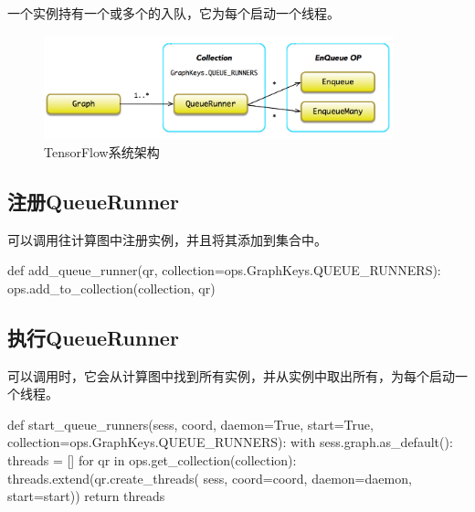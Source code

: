\begin{content}

一个实例持有一个或多个的入队，它为每个启动一个线程。

\begin{figure}[!htbp]
\centering
\includegraphics[width=0.9\textwidth]{figures/tf-queue-runner-model.png}
\caption{TensorFlow系统架构}
 \label{fig:tf-queue-runner-model}
\end{figure}

\subsection{注册QueueRunner}

可以调用往计算图中注册实例，并且将其添加到集合中。

\begin{leftbar}
\begin{python}
def add_queue_runner(qr, collection=ops.GraphKeys.QUEUE_RUNNERS):
  ops.add_to_collection(collection, qr)
\end{python}
\end{leftbar}

\subsection{执行QueueRunner}

可以调用时，它会从计算图中找到所有实例，并从实例中取出所有，为每个启动一个线程。

\begin{leftbar}
\begin{python}
def start_queue_runners(sess, coord, daemon=True, start=True,
                        collection=ops.GraphKeys.QUEUE_RUNNERS):
  with sess.graph.as_default():
    threads = []
    for qr in ops.get_collection(collection):
      threads.extend(qr.create_threads(
          sess, coord=coord, daemon=daemon, start=start))
  return threads
\end{python}
\end{leftbar}


\end{content}
